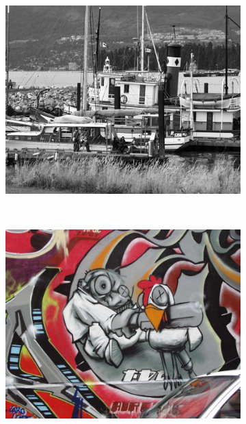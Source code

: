 \documentclass[review]{elsarticle}
\begin{document}
\begin{figure}[b]
    \centering
    \begin{subfigure}[t]{0.20\columnwidth}
        \centering
        \includegraphics[width=1\columnwidth]{images/acr/boat1}
    \end{subfigure}%
    ~ %
    \begin{subfigure}[t]{0.20\columnwidth}
        \centering
        \includegraphics[width=1\columnwidth]{images/acr/graf1}
    \end{subfigure}%
    ~ %
    \begin{subfigure}[t]{0.23\columnwidth}

\end{subfigure}
\end{figure}
\end{document}
